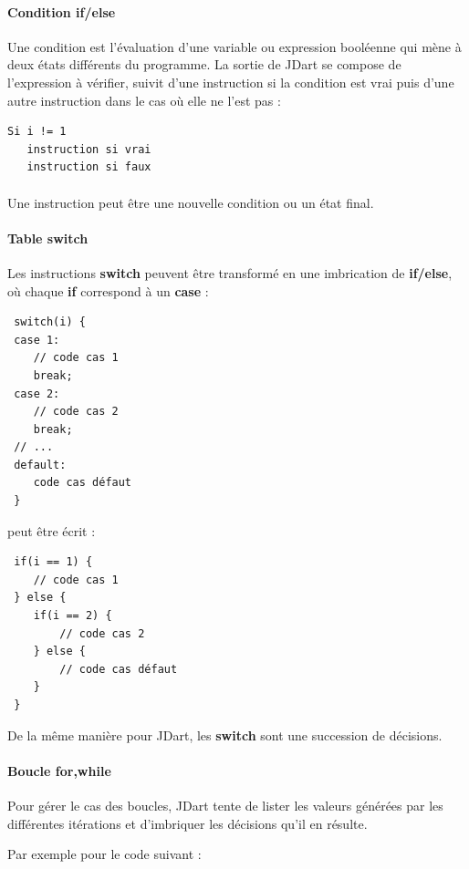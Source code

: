 \paragraph{Condition if/else}
Une condition est l'évaluation d'une variable ou expression booléenne qui mène 
à deux états différents du programme. La sortie de JDart se compose de 
l'expression à vérifier, suivit d'une instruction si la condition est vrai 
puis d'une autre instruction dans le cas où elle ne l'est pas :

\begin{verbatim}
Si i != 1
   instruction si vrai
   instruction si faux
\end{verbatim}

\paragraph{}
Une instruction peut être une nouvelle condition ou un état final.

\paragraph{Table switch}
Les instructions \textbf{switch} peuvent être transformé en une imbrication de 
\textbf{if/else}, où chaque \textbf{if} correspond à un \textbf{case} :

\begin{verbatim}
 switch(i) {
 case 1:
	// code cas 1
	break;
 case 2:
	// code cas 2
	break;
 // ...
 default:
	code cas défaut
 }
\end{verbatim}

peut être écrit :
\begin{verbatim}
 if(i == 1) {
	// code cas 1
 } else {
	if(i == 2) {
		// code cas 2
	} else {
		// code cas défaut
	}
 }
\end{verbatim}

De la même manière pour JDart, les \textbf{switch} sont une succession de 
décisions.

\paragraph{Boucle for,while}
Pour gérer le cas des boucles, JDart tente de lister les valeurs générées par 
les différentes itérations et d'imbriquer les décisions  qu'il en résulte.


Par exemple pour le code suivant :


